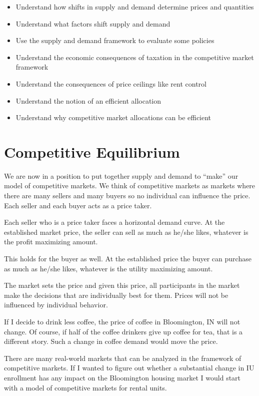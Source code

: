 \documentclass[
]{book}
\providecommand{\tightlist}{%
  \setlength{\itemsep}{0pt}\setlength{\parskip}{0pt}}
\begin{document}
\begin{itemize}
\tightlist
\item
  Understand how shifts in supply and demand determine prices and quantities
\item
  Understand what factors shift supply and demand
\item
  Use the supply and demand framework to evaluate some policies
\item
  Understand the economic consequences of taxation in the competitive market framework
\item
  Understand the consequences of price ceilings like rent control
\item
  Understand the notion of an efficient allocation
\item
  Understand why competitive market allocations can be efficient
\end{itemize}

\hypertarget{competitive-equilibrium}{%
\section{Competitive Equilibrium}\label{competitive-equilibrium}}

We are now in a position to put together supply and demand to ``make'' our model of competitive markets. We think of competitive markets as markets where there are many sellers and many buyers so no individual can influence the price. Each seller and each buyer acts as a price taker.

Each seller who is a price taker faces a horizontal demand curve. At the established market price, the seller can sell as much as he/she likes, whatever is the profit maximizing amount.

This holds for the buyer as well. At the established price the buyer can purchase as much as he/she likes, whatever is the utility maximizing amount.

The market sets the price and given this price, all participants in the market make the decisions that are individually best for them. Prices will not be influenced by individual behavior.

If I decide to drink less coffee, the price of coffee in Bloomington, IN will not change. Of course, if half of the coffee drinkers give up coffee for tea, that is a different story. Such a change in coffee demand would move the price.

There are many real-world markets that can be analyzed in the framework of competitive markets. If I wanted to figure out whether a substantial change in IU enrollment has any impact on the Bloomington housing market I would start with a model of competitive markets for rental units.
\end{document}
